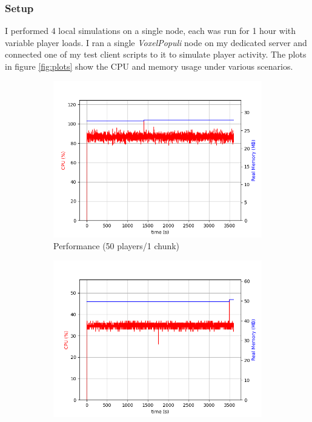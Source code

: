 \documentclass[10pt,twoside,notitlepage,a4paper]{report}
\newcommand{\voxpop}{\emph{VoxelPopuli}}
\begin{document}
	\subsubsection{Setup}
	I performed 4 local simulations on a single node, each was run for 1 hour with variable player loads. I ran a single \voxpop{} node on my dedicated server and connected one of my test client scripts to it to simulate player activity. The plots in figure \ref{fig:plots} show the CPU and memory usage under various scenarios.
	\begin{figure}
		\begin{subfigure}{0.5\textwidth}
			\includegraphics[width=\textwidth]{plot1.png}
			\caption{Performance (50 players/1 chunk)}
			\label{fig:plot1}
		\end{subfigure}
		\begin{subfigure}{0.5\textwidth}
			\includegraphics[width=\textwidth]{plot2.png}

\end{subfigure}
\end{figure}
\end{document}
